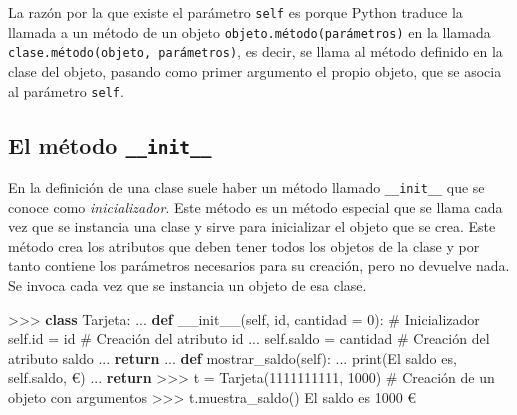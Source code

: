 \documentclass[
  spanish,
  a4paper,
]{scrreport}
\newenvironment{Shaded}{\begin{snugshade}}{\end{snugshade}}
\newcommand{\BuiltInTok}[1]{\textcolor[rgb]{0.00,0.23,0.31}{#1}}
\newcommand{\CommentTok}[1]{\textcolor[rgb]{0.37,0.37,0.37}{#1}}
\newcommand{\ControlFlowTok}[1]{\textcolor[rgb]{0.00,0.23,0.31}{\textbf{#1}}}
\newcommand{\DecValTok}[1]{\textcolor[rgb]{0.68,0.00,0.00}{#1}}
\newcommand{\FunctionTok}[1]{\textcolor[rgb]{0.28,0.35,0.67}{#1}}
\newcommand{\KeywordTok}[1]{\textcolor[rgb]{0.00,0.23,0.31}{\textbf{#1}}}
\newcommand{\NormalTok}[1]{\textcolor[rgb]{0.00,0.23,0.31}{#1}}
\newcommand{\OperatorTok}[1]{\textcolor[rgb]{0.37,0.37,0.37}{#1}}
\newcommand{\StringTok}[1]{\textcolor[rgb]{0.13,0.47,0.30}{#1}}
\newcommand{\VariableTok}[1]{\textcolor[rgb]{0.07,0.07,0.07}{#1}}
\begin{document}
La razón por la que existe el parámetro \texttt{self} es porque Python
traduce la llamada a un método de un objeto
\texttt{objeto.método(parámetros)} en la llamada
\texttt{clase.método(objeto,\ parámetros)}, es decir, se llama al método
definido en la clase del objeto, pasando como primer argumento el propio
objeto, que se asocia al parámetro \texttt{self}.

\subsection{\texorpdfstring{El método
\texttt{\_\_init\_\_}}{El método \_\_init\_\_}}\label{el-muxe9todo-__init__}

En la definición de una clase suele haber un método llamado
\texttt{\_\_init\_\_} que se conoce como \emph{inicializador}. Este
método es un método especial que se llama cada vez que se instancia una
clase y sirve para inicializar el objeto que se crea. Este método crea
los atributos que deben tener todos los objetos de la clase y por tanto
contiene los parámetros necesarios para su creación, pero no devuelve
nada. Se invoca cada vez que se instancia un objeto de esa clase.

\begin{Shaded}
\begin{Highlighting}[]
\OperatorTok{\textgreater{}\textgreater{}\textgreater{}} \KeywordTok{class}\NormalTok{ Tarjeta:}
\NormalTok{...     }\KeywordTok{def} \FunctionTok{\_\_init\_\_}\NormalTok{(}\VariableTok{self}\NormalTok{, }\BuiltInTok{id}\NormalTok{, cantidad }\OperatorTok{=} \DecValTok{0}\NormalTok{):    }\CommentTok{\# Inicializador}
            \VariableTok{self}\NormalTok{.}\BuiltInTok{id} \OperatorTok{=} \BuiltInTok{id}                         \CommentTok{\# Creación del atributo id  }
\NormalTok{...         }\VariableTok{self}\NormalTok{.saldo }\OperatorTok{=}\NormalTok{ cantidad                }\CommentTok{\# Creación del atributo saldo}
\NormalTok{...         }\ControlFlowTok{return}
\NormalTok{...     }\KeywordTok{def}\NormalTok{ mostrar\_saldo(}\VariableTok{self}\NormalTok{):}
\NormalTok{...         }\BuiltInTok{print}\NormalTok{(}\StringTok{\textquotesingle{}El saldo es\textquotesingle{}}\NormalTok{, }\VariableTok{self}\NormalTok{.saldo, }\StringTok{\textquotesingle{}€\textquotesingle{}}\NormalTok{)}
\NormalTok{...         }\ControlFlowTok{return}
\OperatorTok{\textgreater{}\textgreater{}\textgreater{}}\NormalTok{ t }\OperatorTok{=}\NormalTok{ Tarjeta(}\StringTok{\textquotesingle{}1111111111\textquotesingle{}}\NormalTok{, }\DecValTok{1000}\NormalTok{)     }\CommentTok{\# Creación de un objeto con argumentos             }
\OperatorTok{\textgreater{}\textgreater{}\textgreater{}}\NormalTok{ t.muestra\_saldo()}
\NormalTok{El saldo es }\DecValTok{1000}\NormalTok{ €}
\end{Highlighting}
\end{Shaded}
\end{document}
